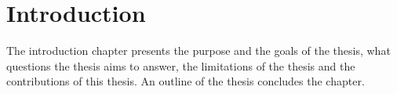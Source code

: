 \chapter{Introduction}\label{cha:intro}

The introduction chapter presents the purpose and the goals of the thesis, what questions the thesis aims to answer, the limitations of the thesis and the contributions of this thesis. An outline of the thesis concludes the chapter.







